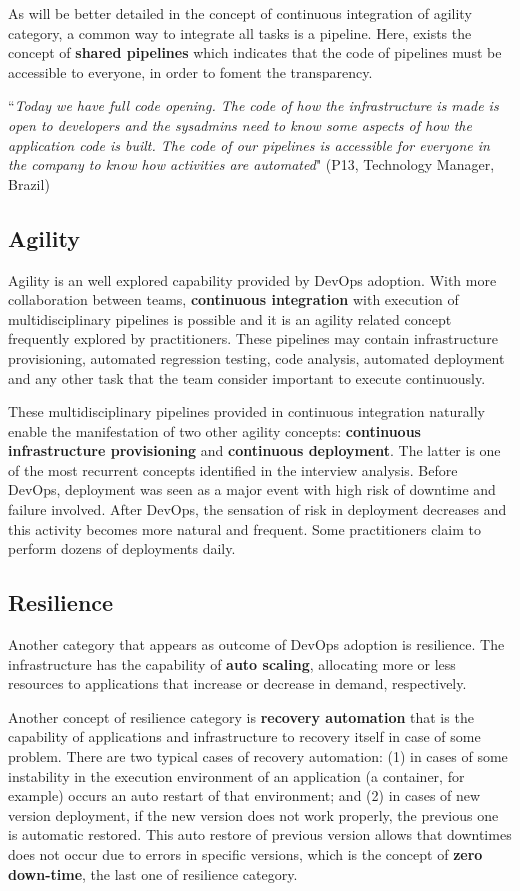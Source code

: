 As will be better detailed in the concept of continuous integration of agility
category, a common way to integrate all tasks is a pipeline. Here, exists the
concept of \textbf{shared pipelines} which indicates that the code of pipelines
must be accessible to everyone, in order to foment the transparency.

\begin{mq}
``\emph{Today we have full code opening. The code of how the infrastructure is
made is open to developers and the sysadmins need to know some aspects of how 
the application code is built. The code of our pipelines is accessible for
everyone in the company to know how activities are automated}" (P13, Technology
Manager, Brazil)
\end{mq}

\subsection{Agility}

Agility is an well explored capability provided by DevOps adoption. With more
collaboration between teams, \textbf{continuous integration} with execution of
multidisciplinary pipelines is possible and it is an agility related concept
frequently explored by practitioners. These pipelines may contain
infrastructure provisioning, automated regression testing, code analysis,
automated deployment and any other task that the team consider important to
execute continuously.

These multidisciplinary pipelines provided in continuous integration naturally
enable the manifestation of two other agility concepts: \textbf{continuous
infrastructure provisioning} and \textbf{continuous deployment}. The latter is
one of the most recurrent concepts identified in the interview analysis. Before
DevOps, deployment was seen as a major event with high risk of downtime and
failure involved. After DevOps, the sensation of risk in deployment decreases
and this activity becomes more natural and frequent. Some practitioners claim
to perform dozens of deployments daily.

\subsection{Resilience}
Another category that appears as outcome of DevOps adoption is resilience. The
infrastructure has the capability of \textbf{auto scaling}, allocating more or
less resources to applications that increase or decrease in demand,
respectively.

Another concept of resilience category is \textbf{recovery automation} that is
the capability of applications and infrastructure to recovery itself in case of
some problem. There are two typical cases of recovery automation: (1) in cases
of some instability in the execution environment of an application (a
container, for example) occurs an auto restart of that environment; and (2) in
cases of new version deployment, if the new version does not work properly, the
previous one is automatic restored. This auto restore of previous version
allows that downtimes does not occur due to errors in specific versions, which
is the concept of \textbf{zero down-time}, the last one of resilience category.
